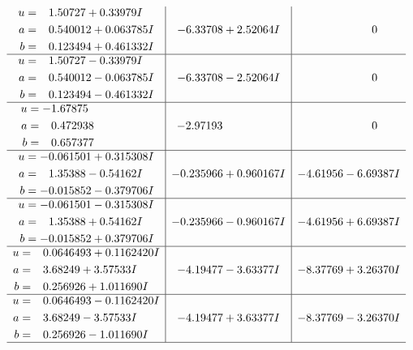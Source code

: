 \documentclass[1p]{elsarticle_modified}
\theoremstyle{definition}
\begin{document}
$$\begin{array}{c|c|c}
\begin{aligned}
u &= \phantom{-}1.50727 + 0.33979 I \\
a &= \phantom{-}0.540012 + 0.063785 I \\
b &= \phantom{-}0.123494 + 0.461332 I\end{aligned}
 & -6.33708 + 2.52064 I & \phantom{-0.000000 } 0 \\ \hline\begin{aligned}
u &= \phantom{-}1.50727 - 0.33979 I \\
a &= \phantom{-}0.540012 - 0.063785 I \\
b &= \phantom{-}0.123494 - 0.461332 I\end{aligned}
 & -6.33708 - 2.52064 I & \phantom{-0.000000 } 0 \\ \hline\begin{aligned}
u &= -1.67875\phantom{ +0.000000I} \\
a &= \phantom{-}0.472938\phantom{ +0.000000I} \\
b &= \phantom{-}0.657377\phantom{ +0.000000I}\end{aligned}
 & -2.97193\phantom{ +0.000000I} & \phantom{-0.000000 } 0 \\ \hline\begin{aligned}
u &= -0.061501 + 0.315308 I \\
a &= \phantom{-}1.35388 - 0.54162 I \\
b &= -0.015852 - 0.379706 I\end{aligned}
 & -0.235966 + 0.960167 I & -4.61956 - 6.69387 I \\ \hline\begin{aligned}
u &= -0.061501 - 0.315308 I \\
a &= \phantom{-}1.35388 + 0.54162 I \\
b &= -0.015852 + 0.379706 I\end{aligned}
 & -0.235966 - 0.960167 I & -4.61956 + 6.69387 I \\ \hline\begin{aligned}
u &= \phantom{-}0.0646493 + 0.1162420 I \\
a &= \phantom{-}3.68249 + 3.57533 I \\
b &= \phantom{-}0.256926 + 1.011690 I\end{aligned}
 & -4.19477 - 3.63377 I & -8.37769 + 3.26370 I \\ \hline\begin{aligned}
u &= \phantom{-}0.0646493 - 0.1162420 I \\
a &= \phantom{-}3.68249 - 3.57533 I \\
b &= \phantom{-}0.256926 - 1.011690 I\end{aligned}
 & -4.19477 + 3.63377 I & -8.37769 - 3.26370 I\\
 \hline 
 \end{array}$$\newpage\newpage\renewcommand{\arraystretch}{1}
\end{document}
